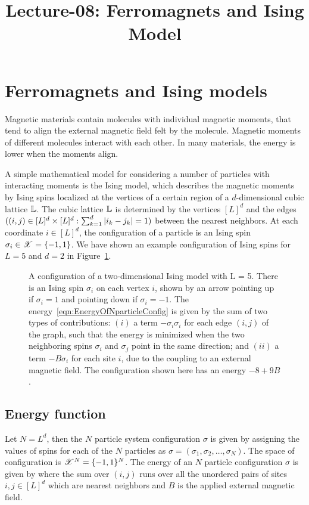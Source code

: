 \documentclass[letterpaper,english,10pt]{article}
\title{Lecture-08: Ferromagnets and Ising Model}
\begin{document}
\maketitle
\section{Ferromagnets and Ising models}
Magnetic materials contain molecules with individual magnetic moments, that tend to align the external magnetic field felt by the molecule. 
Magnetic moments of different molecules interact with each other. 
In many materials, the energy is lower when the moments align. 

A simple mathematical model for considering a number of particles with interacting moments is the Ising model, which describes the magnetic moments by Ising spins localized at the vertices of a certain region of a $d$-dimensional cubic lattice $\mathbb{L}$. 
The cubic lattice $\mathbb{L}$ is determined by the vertices $[L]^d$ and the edges $((i,j) \in [L]^d \times [L]^d: \sum_{k=1}^d\left\lvert i_k-j_k\right\rvert = 1)$ between the nearest neighbors.  
At each coordinate $i \in [L]^d$, the configuration of a particle is an Ising spin $\sigma_i \in \mathscr{X} = \{-1,1\}$. 
We have shown an example configuration of Ising spins for $L=5$ and $d=2$ in Figure~\ref{figure:IsingSpins}. 

\begin{figure}
\centering

\caption{A configuration of a two-dimensional Ising model with L = 5. There is an Ising spin $\sigma_i$ on each vertex $i$, shown by an arrow pointing up if $\sigma_i = 1$ and pointing down if $\sigma_i = -1$.
The energy~\eqref{eqn:EnergyOfNparticleConfig}  is given by the sum of two types of contributions: 
$(i)$ a term $-\sigma_i\sigma_i$ for each edge $(i, j)$ of the graph, such that the energy is minimized when the two neighboring spins $\sigma_i$ and $\sigma_j$ point in the same direction; 
and $(ii)$ a term $-B\sigma_i$ for each site $i$, due to the coupling to an external magnetic field. 
The configuration shown here has an energy $-8+9B$.}
\label{figure:IsingSpins}
\end{figure}

\subsection{Energy function}
Let $N = L^d$, then the $N$ particle system configuration $\sigma$ is given by assigning the values of spins  for each of the $N$ particles as $\sigma = (\sigma_1, \sigma_2, \dots, \sigma_N)$. 
The space of configuration is $\mathscr{X}^N = \{-1,1\}^N$. 
The energy of an $N$ particle configuration $\sigma$ is given by
where the sum over $(i,j)$ runs over all the unordered pairs of sites $i,j \in [L]^d$ which are nearest neighbors and $B$ is the applied external magnetic field. 
\end{document}
